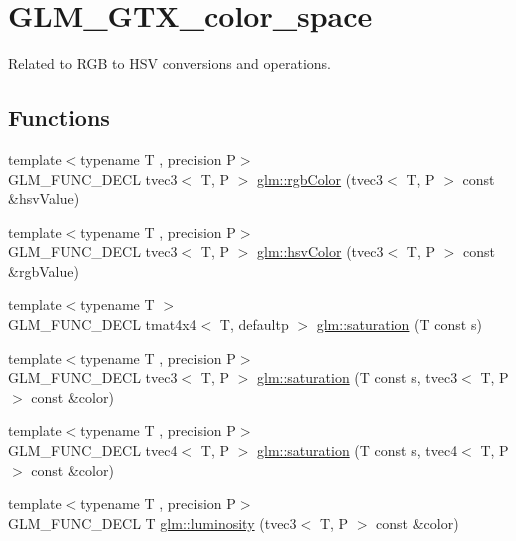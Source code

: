 \hypertarget{group__gtx__color__space}{}\section{G\+L\+M\+\_\+\+G\+T\+X\+\_\+color\+\_\+space}
\label{group__gtx__color__space}


Related to R\+G\+B to H\+S\+V conversions and operations.  


\subsection*{Functions}
\begin{DoxyCompactItemize}
\item 
{\footnotesize template$<$typename T , precision P$>$ }\\G\+L\+M\+\_\+\+F\+U\+N\+C\+\_\+\+D\+E\+C\+L tvec3$<$ T, P $>$ \hyperlink{group__gtx__color__space_ga36b0619e31daf57bc4a54dac2dcf34b7}{glm\+::rgb\+Color} (tvec3$<$ T, P $>$ const \&hsv\+Value)
\item 
{\footnotesize template$<$typename T , precision P$>$ }\\G\+L\+M\+\_\+\+F\+U\+N\+C\+\_\+\+D\+E\+C\+L tvec3$<$ T, P $>$ \hyperlink{group__gtx__color__space_gae72039c00a7be2f03a3b94b37a54349a}{glm\+::hsv\+Color} (tvec3$<$ T, P $>$ const \&rgb\+Value)
\item 
{\footnotesize template$<$typename T $>$ }\\G\+L\+M\+\_\+\+F\+U\+N\+C\+\_\+\+D\+E\+C\+L tmat4x4$<$ T, defaultp $>$ \hyperlink{group__gtx__color__space_gafecfb15d58da8445103745af3348e516}{glm\+::saturation} (T const s)
\item 
{\footnotesize template$<$typename T , precision P$>$ }\\G\+L\+M\+\_\+\+F\+U\+N\+C\+\_\+\+D\+E\+C\+L tvec3$<$ T, P $>$ \hyperlink{group__gtx__color__space_ga632ee8dadb44e90a05885f6f8c07d46c}{glm\+::saturation} (T const s, tvec3$<$ T, P $>$ const \&color)
\item 
{\footnotesize template$<$typename T , precision P$>$ }\\G\+L\+M\+\_\+\+F\+U\+N\+C\+\_\+\+D\+E\+C\+L tvec4$<$ T, P $>$ \hyperlink{group__gtx__color__space_ga2033e0566c595230714af396744e8a61}{glm\+::saturation} (T const s, tvec4$<$ T, P $>$ const \&color)
\item 
{\footnotesize template$<$typename T , precision P$>$ }\\G\+L\+M\+\_\+\+F\+U\+N\+C\+\_\+\+D\+E\+C\+L T \hyperlink{group__gtx__color__space_gaa2f38a5100c3e1c7d39920df43bd8cbe}{glm\+::luminosity} (tvec3$<$ T, P $>$ const \&color)
\end{DoxyCompactItemize}


